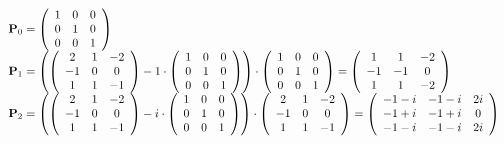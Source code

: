 \begin{equation*}
 \begin{array}{l}
    {\bf P}_0 = \left( \begin{array}{ccc}
      1 & 0 & 0\\
      0 & 1 & 0\\
      0 & 0 & 1
    \end{array}\right)\\
    {\bf P}_1 = \left(\left( \begin{array}{ccc}
      2 & 1 & -2\\
      -1 & 0 & 0\\
      1 & 1 & -1
    \end{array}\right)
    - 1 \cdot\left( \begin{array}{ccc}
      1 & 0 & 0\\
      0 & 1 & 0\\
      0 & 0 & 1
    \end{array}\right)\right)
    \cdot\left( \begin{array}{ccc}
      1 & 0 & 0\\
      0 & 1 & 0\\
      0 & 0 & 1
    \end{array}\right)
    = \left( \begin{array}{ccc}
      1 & 1 & -2\\
      -1 & -1 & 0\\
      1 & 1 & -2
    \end{array}\right)\\
    {\bf P}_2 = \left(\left( \begin{array}{ccc}
      2 & 1 & -2\\
      -1 & 0 & 0\\
      1 & 1 & -1
    \end{array}\right)
    - i \cdot\left( \begin{array}{ccc}
      1 & 0 & 0\\
      0 & 1 & 0\\
      0 & 0 & 1
    \end{array}\right)\right)
    \cdot\left( \begin{array}{ccc}
      2 & 1 & -2\\
      -1 & 0 & 0\\
      1 & 1 & -1
    \end{array}\right)
    = \left( \begin{array}{ccc}
      -1 - i & -1 - i & 2i\\
      -1 + i & -1 + i & 0\\
      -1 - i & -1 - i & 2i
    \end{array}\right)
\end{array}
\end{equation*}
